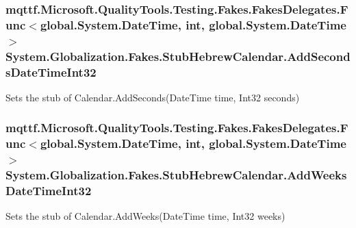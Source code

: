 \hypertarget{class_system_1_1_globalization_1_1_fakes_1_1_stub_hebrew_calendar_a0e4e585b649fd382817bc2b0212caedb}{
\subsubsection[{Add\-Seconds\-Date\-Time\-Int32}]{\setlength{\rightskip}{0pt plus 5cm}mqttf.\-Microsoft.\-Quality\-Tools.\-Testing.\-Fakes.\-Fakes\-Delegates.\-Func$<$global.\-System.\-Date\-Time, int, global.\-System.\-Date\-Time$>$ System.\-Globalization.\-Fakes.\-Stub\-Hebrew\-Calendar.\-Add\-Seconds\-Date\-Time\-Int32}}\label{class_system_1_1_globalization_1_1_fakes_1_1_stub_hebrew_calendar_a0e4e585b649fd382817bc2b0212caedb}


Sets the stub of Calendar.\-Add\-Seconds(\-Date\-Time time, Int32 seconds)

\hypertarget{class_system_1_1_globalization_1_1_fakes_1_1_stub_hebrew_calendar_af19e7e964b00e501948e589cb6029e37}{
\subsubsection[{Add\-Weeks\-Date\-Time\-Int32}]{\setlength{\rightskip}{0pt plus 5cm}mqttf.\-Microsoft.\-Quality\-Tools.\-Testing.\-Fakes.\-Fakes\-Delegates.\-Func$<$global.\-System.\-Date\-Time, int, global.\-System.\-Date\-Time$>$ System.\-Globalization.\-Fakes.\-Stub\-Hebrew\-Calendar.\-Add\-Weeks\-Date\-Time\-Int32}}\label{class_system_1_1_globalization_1_1_fakes_1_1_stub_hebrew_calendar_af19e7e964b00e501948e589cb6029e37}


Sets the stub of Calendar.\-Add\-Weeks(\-Date\-Time time, Int32 weeks)

